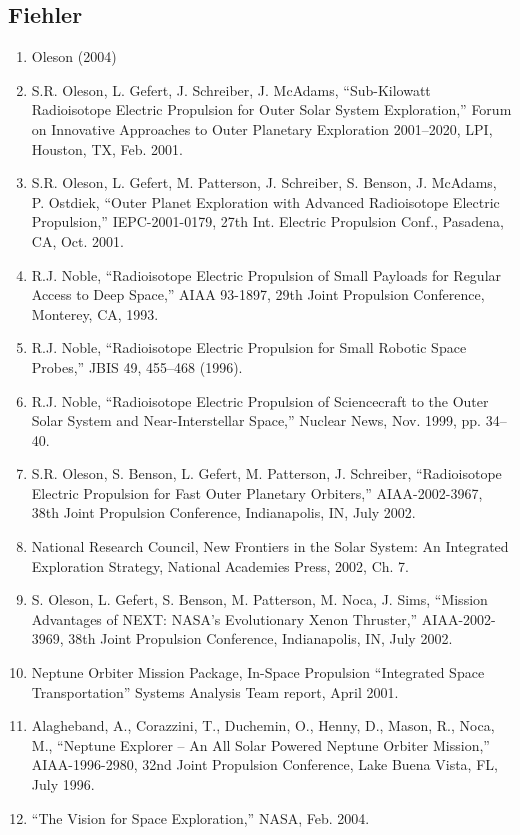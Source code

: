\documentclass[12pt]{article}
\begin{document}
\subsection*{Fiehler}
\begin{enumerate}
\item Oleson (2004)
\item S.R. Oleson, L. Gefert, J. Schreiber, J. McAdams, ``Sub-Kilowatt Radioisotope Electric Propulsion for Outer Solar System Exploration,'' Forum on Innovative Approaches to Outer Planetary Exploration 2001--2020, LPI, Houston, TX, Feb. 2001.
\item S.R. Oleson, L. Gefert, M. Patterson, J. Schreiber, S. Benson, J. McAdams, P. Ostdiek, ``Outer Planet Exploration with Advanced Radioisotope Electric Propulsion,'' IEPC-2001-0179, 27th Int. Electric Propulsion Conf., Pasadena, CA, Oct. 2001.
\item R.J. Noble, ``Radioisotope Electric Propulsion of Small Payloads for Regular Access to Deep Space,'' AIAA 93-1897, 29th Joint Propulsion Conference, Monterey, CA, 1993.
\item R.J. Noble, ``Radioisotope Electric Propulsion for Small Robotic Space Probes,'' JBIS 49, 455--468 (1996).
\item R.J. Noble, ``Radioisotope Electric Propulsion of Sciencecraft to the Outer Solar System and Near-Interstellar Space,'' Nuclear News, Nov. 1999, pp. 34--40.
\item S.R. Oleson, S. Benson, L. Gefert, M. Patterson, J. Schreiber, ``Radioisotope Electric Propulsion for Fast Outer Planetary Orbiters,'' AIAA-2002-3967, 38th Joint Propulsion Conference, Indianapolis, IN, July 2002.
\item National Research Council, New Frontiers in the Solar System: An Integrated Exploration Strategy, National Academies Press, 2002, Ch. 7.
\item S. Oleson, L. Gefert, S. Benson, M. Patterson, M. Noca, J. Sims, ``Mission Advantages of NEXT: NASA’s Evolutionary Xenon Thruster,'' AIAA-2002-3969, 38th Joint Propulsion Conference, Indianapolis, IN, July 2002.
\item Neptune Orbiter Mission Package, In-Space Propulsion ``Integrated Space Transportation'' Systems Analysis Team report, April 2001.
\item Alagheband, A., Corazzini, T., Duchemin, O., Henny, D., Mason, R., Noca, M., ``Neptune Explorer – An All Solar Powered Neptune Orbiter Mission,'' AIAA-1996-2980, 32nd Joint Propulsion Conference, Lake Buena Vista, FL, July 1996.
\item ``The Vision for Space Exploration,'' NASA, Feb. 2004.

\end{enumerate}
\end{document}
